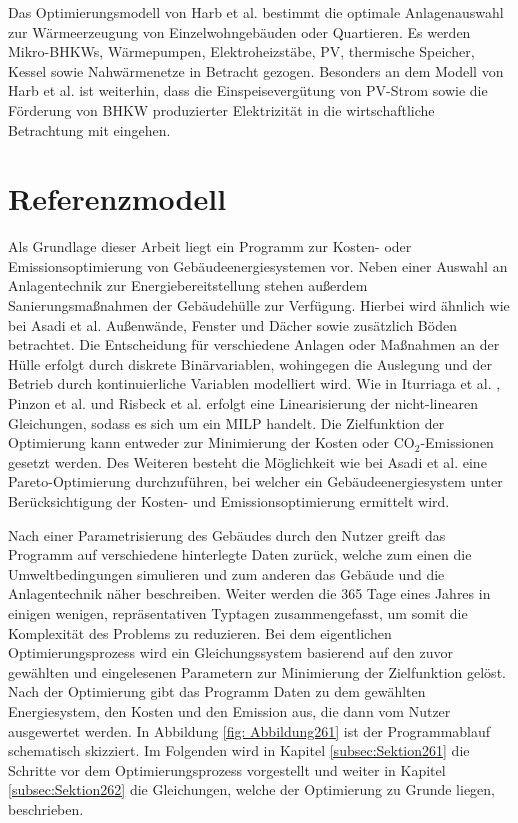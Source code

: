 Das Optimierungsmodell von Harb et al. \cite{Harb.2016} bestimmt die optimale Anlagenauswahl zur Wärmeerzeugung von Einzelwohngebäuden oder Quartieren.
Es werden Mikro-BHKWs, Wärmepumpen, Elektroheizstäbe, PV, thermische Speicher, Kessel sowie Nahwärmenetze in Betracht gezogen.
Besonders an dem Modell von Harb et al. ist weiterhin, dass die Einspeisevergütung von PV-Strom sowie die Förderung von BHKW produzierter Elektrizität in die wirtschaftliche Betrachtung mit eingehen.

\section{Referenzmodell}
\label{sec:Sektion 26}

Als Grundlage dieser Arbeit liegt ein Programm zur Kosten- oder Emissionsoptimierung von Gebäudeenergiesystemen vor.
Neben einer Auswahl an Anlagentechnik zur Energiebereitstellung stehen außerdem Sanierungsmaßnahmen der Gebäudehülle zur Verfügung. 
Hierbei wird ähnlich wie bei Asadi et al. \cite{Asadi.2012} Außenwände, Fenster und Dächer sowie zusätzlich Böden betrachtet.
Die Entscheidung für verschiedene Anlagen oder Maßnahmen an der Hülle erfolgt durch diskrete Binärvariablen, wohingegen die Auslegung und der Betrieb durch kontinuierliche Variablen modelliert wird.
Wie in Iturriaga et al. \cite{Iturriaga.2017}, Pinzon et al. \cite{Pinzon.23.04.201726.04.2017} und Risbeck et al. \cite{Risbeck.2017} erfolgt eine Linearisierung der nicht-linearen Gleichungen, sodass es sich um ein MILP handelt.
Die Zielfunktion der Optimierung kann entweder zur Minimierung der Kosten oder CO\(_2\)-Emissionen gesetzt werden.
Des Weiteren besteht die Möglichkeit wie bei Asadi et al. \cite{Asadi.2012} eine Pareto-Optimierung durchzuführen, bei welcher ein Gebäudeenergiesystem unter Berücksichtigung der Kosten- und Emissionsoptimierung ermittelt wird.

Nach einer Parametrisierung des Gebäudes durch den Nutzer greift das Programm auf verschiedene hinterlegte Daten zurück, welche zum einen die Umweltbedingungen simulieren und zum anderen das Gebäude und die Anlagentechnik näher beschreiben.
Weiter werden die 365 Tage eines Jahres in einigen wenigen, repräsentativen Typtagen zusammengefasst, um somit die Komplexität des Problems zu reduzieren.
Bei dem eigentlichen Optimierungsprozess wird ein Gleichungssystem basierend auf den zuvor gewählten und eingelesenen Parametern zur Minimierung der Zielfunktion gelöst.
Nach der Optimierung gibt das Programm Daten zu dem gewählten Energiesystem, den Kosten und den Emission aus, die dann vom Nutzer ausgewertet werden.
In Abbildung \ref{fig: Abbildung261} ist der Programmablauf schematisch skizziert.
Im Folgenden wird in Kapitel \ref{subsec:Sektion261} die Schritte vor dem Optimierungsprozess vorgestellt und weiter in Kapitel \ref{subsec:Sektion262} die Gleichungen, welche der Optimierung zu Grunde liegen, beschrieben.

